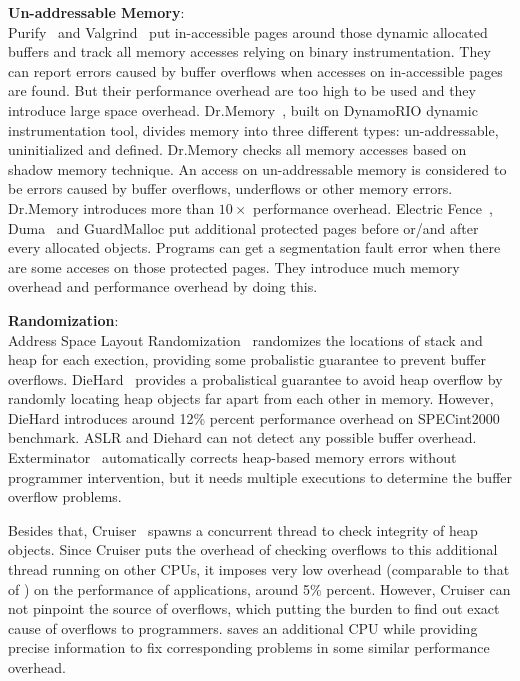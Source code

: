 \textbf{Un-addressable Memory}: \\
Purify~\cite{overflow:purify} and Valgrind~\cite{overflow:valgrind}
put in-accessible pages around those dynamic allocated buffers and 
track all memory accesses relying on binary instrumentation. 
They can report errors caused by buffer overflows when accesses on in-accessible pages are found.
But their performance overhead are too high to be used and they introduce large space overhead.
Dr.Memory~\cite{overflow:drmemory}, built on DynamoRIO dynamic instrumentation tool, divides memory
into three different types: un-addressable, uninitialized and defined. Dr.Memory checks all memory
accesses based on shadow memory technique. An access on un-addressable memory is considered
to be errors caused by buffer overflows, underflows or other memory errors. Dr.Memory introduces more 
than $10\times$ performance overhead.    
Electric Fence~\cite{electricfence}, Duma~\cite{duma} and GuardMalloc put additional protected pages
before or/and after every allocated objects. Programs can get a segmentation fault error when there
are some acceses on those protected pages. They introduce much memory overhead and performance overhead
by doing this. 
 
\textbf{Randomization}: \\
Address Space Layout Randomization~\cite{addressobfuscation, Pax} randomizes the locations of stack and heap for each exection, providing some probalistic guarantee to prevent buffer overflows.  
DieHard~\cite{diehard} provides a probalistical guarantee to avoid heap overflow by randomly locating 
heap objects far apart from each other in memory. However, DieHard introduces around 12\% percent performance overhead on SPECint2000 benchmark. 
ASLR and Diehard can not detect any possible buffer overhead. 
Exterminator~\cite{exterminator} automatically corrects heap-based memory errors without programmer 
intervention, but it needs multiple executions to determine the buffer overflow 
problems.

Besides that, Cruiser~\cite{overflow:Cruiser} spawns a concurrent thread to check integrity of heap objects.
Since Cruiser puts the overhead of checking overflows to this additional thread running on other CPUs,
it imposes very low overhead (comparable to that of \doubletake{}) on the performance of applications, 
around 5\% percent. However, Cruiser can not pinpoint the source of overflows, which putting the 
burden to find out exact cause of overflows to programmers. 
\doubletake{} saves an additional CPU while providing precise information to fix corresponding problems
in some similar performance overhead.   

